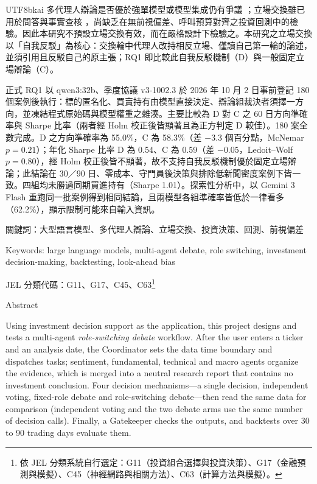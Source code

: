 \documentclass[12pt,a4paper]{article}
\newcommand{\grp}[1]{\textsf{#1}}
\begin{document}
\begin{CJK}{UTF8}{bkai}
多代理人辯論是否優於強單模型或模型集成仍有爭議 \citep{smit2023mad,zhang2025stop}；立場交換雖已用於問答與事實查核 \citep{liu2025roleswitch,chowdhury2026proclaim}，尚缺乏在無前視偏差、呼叫預算對齊之投資回測中的檢驗。因此本研究不預設立場交換有效，而在嚴格設計下檢驗之。本研究之立場交換以「自我反駁」為核心：交換輪中代理人改持相反立場、僅讀自己第一輪的論述，並須引用且反駁自己的原主張；RQ1 即比較此自我反駁機制（D）與一般固定立場辯論（C）。

正式 RQ1 以 qwen3:32b、季度協議 v3-1002.3 於 2026 年 10 月 2 日事前登記 180 個案例後執行：標的匿名化、買賣持有由模型直接決定、辯論組裁決者須擇一方向，並凍結程式原始碼與模型權重之雜湊。主要比較為 \grp{D} 對 \grp{C} 之 60 日方向準確率與 Sharpe 比率（兩者經 Holm 校正後皆顯著且為正方判定 \grp{D} 較佳）。180 案全數完成。\grp{D} 之方向準確率為 55.0\%，\grp{C} 為 58.3\%（差 $-3.3$ 個百分點，McNemar $p=0.21$）；年化 Sharpe 比率 \grp{D} 為 0.54、\grp{C} 為 0.59（差 $-0.05$，Ledoit--Wolf $p=0.80$），經 Holm 校正後皆不顯著，故不支持自我反駁機制優於固定立場辯論；此結論在 30／90 日、零成本、守門員後決策與排除低新聞密度案例下皆一致。四組均未勝過同期買進持有（Sharpe 1.01）。探索性分析中，以 Gemini 3 Flash 重跑同一批案例得到相同結論，且兩模型各組準確率皆低於一律看多（62.2\%），顯示限制可能來自輸入資訊。

\vspace{0.6cm}
\noindent 關鍵詞：大型語言模型、多代理人辯論、立場交換、投資決策、回測、前視偏差

\vspace{0.2cm}
\noindent Keywords: large language models, multi-agent debate, role switching, investment decision-making, backtesting, look-ahead bias

\vspace{0.2cm}
\noindent JEL 分類代碼：G11、G17、C45、C63\footnote{依 JEL 分類系統自行選定：G11（投資組合選擇與投資決策）、G17（金融預測與模擬）、C45（神經網路與相關方法）、C63（計算方法與模擬）。}

\clearpage
\begin{center}
{\fontsize{16}{24}\selectfont Abstract\par}
\end{center}
\vspace{0.3cm}

\noindent Using investment decision support as the application, this project designs and tests a multi-agent \emph{role-switching debate} workflow. After the user enters a ticker and an analysis date, the Coordinator sets the data time boundary and dispatches tasks; sentiment, fundamental, technical and macro agents organize the evidence, which is merged into a neutral research report that contains no investment conclusion. Four decision mechanisms---a single decision, independent voting, fixed-role debate and role-switching debate---then read the same data for comparison (independent voting and the two debate arms use the same number of decision calls). Finally, a Gatekeeper checks the outputs, and backtests over 30 to 90 trading days evaluate them.


\end{CJK}
\end{document}

